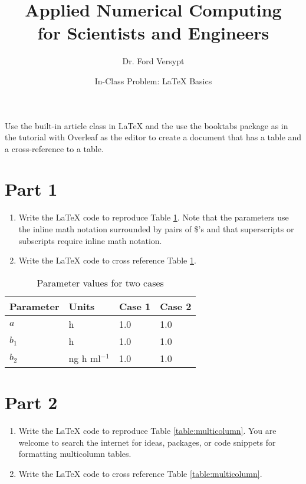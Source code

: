 \documentclass[12pt]{article}
\title{Applied Numerical Computing\\ for Scientists and Engineers}
\date{In-Class Problem: \LaTeX{} Basics}
\author{Dr. Ford Versypt}
\begin{document}
\maketitle

Use the built-in article class in \LaTeX{} and the use the booktabs package as in the tutorial with Overleaf as the editor to create a document that has a table and a cross-reference to a table.

\section{Part 1}
\begin{enumerate}
\item Write the \LaTeX{} code to reproduce Table \ref{table:first}. Note that the parameters use the inline math notation surrounded by pairs of \$'s and that superscripts or subscripts require inline math notation.
\item Write the \LaTeX{} code to cross reference Table \ref{table:first}.
\end{enumerate}


\begin{table}[htbp]
\begin{center}
\caption{Parameter values for two cases}
\begin{tabular}{llll}\toprule
Parameter & Units & Case 1 & Case 2 \\ \midrule
$a$ & h & 1.0 & 1.0 \\
$b_1$ & h & 1.0  & 1.0 \\
$b_2$ & ng h ml$^{-1}$ & 1.0 & 1.0 \\ 
\bottomrule
\end{tabular}
\label{table:first}
\end{center}
\end{table} 

\section{Part 2}
\begin{enumerate}
\item Write the \LaTeX{} code to reproduce Table \ref{table:multicolumn}. You are welcome to search the internet for ideas, packages, or code snippets for formatting multicolumn tables.
\item Write the \LaTeX{} code to cross reference Table \ref{table:multicolumn}.
\end{enumerate}
\end{document}
